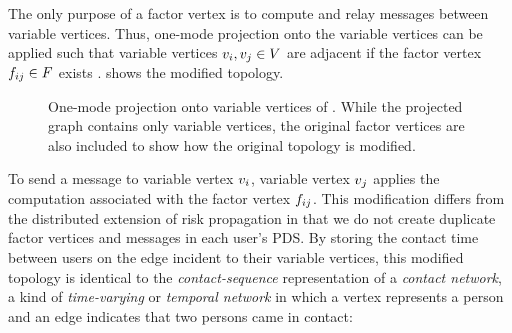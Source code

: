 The only purpose of a factor vertex is to compute and relay messages between variable vertices. Thus, one-mode projection onto the variable vertices can be applied such that variable vertices $v_{i},v_{j} \in V$ are adjacent if the factor vertex $f_{ij} \in F$ exists \cite{Zhou2007}.  shows the modified topology.
%
\begin{figure}[htbp]
\centering
{}
\caption[One-mode projection of a factor graph]{One-mode projection
onto variable vertices of . While the projected graph
contains only variable vertices, the original factor vertices are also included
to show how the original topology is modified.}
\label{fig:projected}
\end{figure}
%
To send a message to variable vertex $v_{i}$, variable vertex $v_{j}$ applies the computation associated with the factor vertex $f_{ij}$. This modification differs from the distributed extension of risk propagation \cite{Ayday2021} in that we do not create duplicate factor vertices and messages in each user's PDS. By storing the contact time between users on the edge incident to their variable vertices, this modified topology is identical to the \emph{contact-sequence} representation of a \emph{contact network}, a kind of \emph{time-varying} or \emph{temporal network} in which a vertex represents a person and an edge indicates that two persons came in contact:

